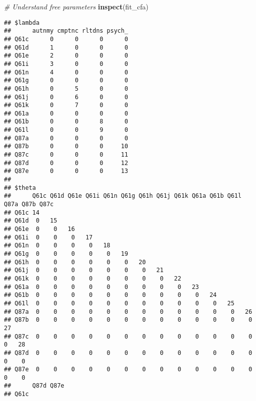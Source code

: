 \documentclass[
]{article}
\newenvironment{Shaded}{\begin{snugshade}}{\end{snugshade}}
\newcommand{\CommentTok}[1]{\textcolor[rgb]{0.56,0.35,0.01}{\textit{#1}}}
\newcommand{\KeywordTok}[1]{\textcolor[rgb]{0.13,0.29,0.53}{\textbf{#1}}}
\newcommand{\NormalTok}[1]{#1}
\begin{document}
\begin{Shaded}
\begin{Highlighting}[]
\CommentTok{# Understand free parameters}
\KeywordTok{inspect}\NormalTok{(fit_cfa)}
\end{Highlighting}
\end{Shaded}

\begin{verbatim}
## $lambda
##      autnmy cmptnc rltdns psych_
## Q61c      0      0      0      0
## Q61d      1      0      0      0
## Q61e      2      0      0      0
## Q61i      3      0      0      0
## Q61n      4      0      0      0
## Q61g      0      0      0      0
## Q61h      0      5      0      0
## Q61j      0      6      0      0
## Q61k      0      7      0      0
## Q61a      0      0      0      0
## Q61b      0      0      8      0
## Q61l      0      0      9      0
## Q87a      0      0      0      0
## Q87b      0      0      0     10
## Q87c      0      0      0     11
## Q87d      0      0      0     12
## Q87e      0      0      0     13
## 
## $theta
##      Q61c Q61d Q61e Q61i Q61n Q61g Q61h Q61j Q61k Q61a Q61b Q61l Q87a Q87b Q87c
## Q61c 14                                                                        
## Q61d  0   15                                                                   
## Q61e  0    0   16                                                              
## Q61i  0    0    0   17                                                         
## Q61n  0    0    0    0   18                                                    
## Q61g  0    0    0    0    0   19                                               
## Q61h  0    0    0    0    0    0   20                                          
## Q61j  0    0    0    0    0    0    0   21                                     
## Q61k  0    0    0    0    0    0    0    0   22                                
## Q61a  0    0    0    0    0    0    0    0    0   23                           
## Q61b  0    0    0    0    0    0    0    0    0    0   24                      
## Q61l  0    0    0    0    0    0    0    0    0    0    0   25                 
## Q87a  0    0    0    0    0    0    0    0    0    0    0    0   26            
## Q87b  0    0    0    0    0    0    0    0    0    0    0    0    0   27       
## Q87c  0    0    0    0    0    0    0    0    0    0    0    0    0    0   28  
## Q87d  0    0    0    0    0    0    0    0    0    0    0    0    0    0    0  
## Q87e  0    0    0    0    0    0    0    0    0    0    0    0    0    0    0  
##      Q87d Q87e
## Q61c          

\end{verbatim}
\end{document}
